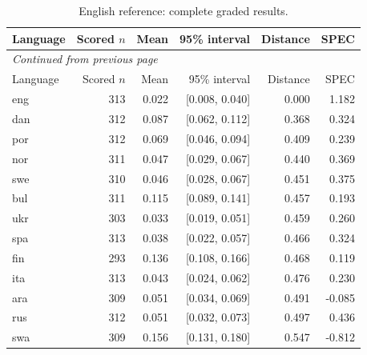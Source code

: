 \endgroup

\begingroup\footnotesize\setlength{\tabcolsep}{3pt}\renewcommand{\arraystretch}{1.12}

\begin{longtable}{lrrrrr}

\caption{English reference: complete graded results.}\label{tab:detail-llama3_1_8b_reference}\\

\toprule

Language & Scored $n$ & Mean & 95\% interval & Distance & SPEC\\\midrule

\endfirsthead

\multicolumn{6}{l}{\textit{Continued from previous page}}\\

\toprule

Language & Scored $n$ & Mean & 95\% interval & Distance & SPEC\\\midrule

\endhead

\bottomrule\endfoot

eng & 313 & 0.022 & [0.008, 0.040] & 0.000 & 1.182\\

dan & 312 & 0.087 & [0.062, 0.112] & 0.368 & 0.324\\

por & 312 & 0.069 & [0.046, 0.094] & 0.409 & 0.239\\

nor & 311 & 0.047 & [0.029, 0.067] & 0.440 & 0.369\\

swe & 310 & 0.046 & [0.028, 0.067] & 0.451 & 0.375\\

bul & 311 & 0.115 & [0.089, 0.141] & 0.457 & 0.193\\

ukr & 303 & 0.033 & [0.019, 0.051] & 0.459 & 0.260\\

spa & 313 & 0.038 & [0.022, 0.057] & 0.466 & 0.324\\

fin & 293 & 0.136 & [0.108, 0.166] & 0.468 & 0.119\\

ita & 313 & 0.043 & [0.024, 0.062] & 0.476 & 0.230\\

ara & 309 & 0.051 & [0.034, 0.069] & 0.491 & -0.085\\

rus & 312 & 0.051 & [0.032, 0.073] & 0.497 & 0.436\\

swa & 309 & 0.156 & [0.131, 0.180] & 0.547 & -0.812\\

\end{longtable}

